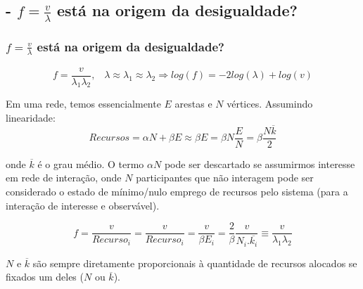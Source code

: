\documentclass[10pt]{beamer}
\begin{document}
\subsection{- $f=\frac{v}{\lambda}$ está na origem da desigualdade?}
\begin{frame}
\frametitle{$f=\frac{v}{\lambda}$ está na origem da desigualdade?}
\begin{equation}
	f=\frac{v}{\lambda_1 \lambda_2},\;\;\; \lambda \approx \lambda_1 \approx \lambda_2 \Rightarrow log(f) = -2log(\lambda) + log(v)
\end{equation}

Em uma rede, temos essencialmente $E$ arestas e $N$ vértices.
Assumindo linearidade:
\begin{equation}
	Recursos=\alpha N + \beta E \approx \beta E = \beta N \frac{E}{N} = \beta \frac{N \overline{k}}{2}
\end{equation}

onde $\overline{k}$ é o grau médio. O termo $\alpha N$ pode ser descartado se assumirmos interesse em rede de interação, onde $N$ participantes que não interagem pode ser considerado o estado de mínimo/nulo emprego de recursos pelo sistema (para a interação de interesse e observável).

\begin{equation}
	f=\frac{v}{Recurso_i}=\frac{v}{Recurso_i}=\frac{v}{\beta E_i}=\frac{2}{\beta}\frac{v}{N_i . \overline{k_i}} \equiv \frac{v}{\lambda_1 \lambda_2}
\end{equation}

$N$ e $\overline{k}$ são sempre diretamente proporcionais à quantidade de recursos alocados se fixados um deles ($N$ ou $\overline{k}$).

\end{frame}
\end{document}
